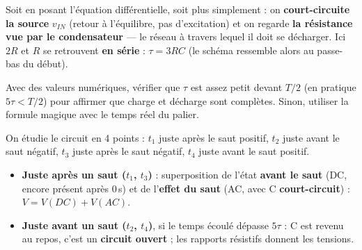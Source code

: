 
\begin{thmbox}[title={Comment calculer $\tau$}]
Soit en posant l'équation différentielle, soit plus simplement : on \textbf{court-circuite la
source} $v_{IN}$ (retour à l'équilibre, pas d'excitation) et on regarde \textbf{la résistance
vue par le condensateur} --- le réseau à travers lequel il doit se décharger. Ici $2R$ et $R$
se retrouvent \textbf{en série} : $\tau = 3RC$ (le schéma ressemble alors au passe-bas du
début).
\end{thmbox}

\begin{warnbox}[title=Vérifier avant d'utiliser les allures]
Avec des valeurs numériques, vérifier que $\tau$ est assez petit devant $T/2$ (en pratique
$5\tau < T/2$) pour affirmer que charge et décharge sont complètes. Sinon, utiliser la formule
magique avec le temps réel du palier.
\end{warnbox}


\begin{thmbox}[title={La recette : 4 instants}]
On étudie le circuit en 4 points : $t_1$ juste après le saut positif, $t_2$ juste avant le
saut négatif, $t_3$ juste après le saut négatif, $t_4$ juste avant le saut positif.
\begin{itemize}
  \item \textbf{Juste après un saut ($t_1$, $t_3$)} : superposition de l'état \textbf{avant
        le saut} (DC, encore présent après 0\,s) et de l'\textbf{effet du saut} (AC, avec C
        \textbf{court-circuit}) : $V = V(DC) + V(AC)$.
  \item \textbf{Juste avant un saut ($t_2$, $t_4$)}, si le temps écoulé dépasse $5\tau$ : C
        est revenu au repos, c'est un \textbf{circuit ouvert} ; les rapports résistifs donnent
        les tensions.
\end{itemize}
\end{thmbox}

